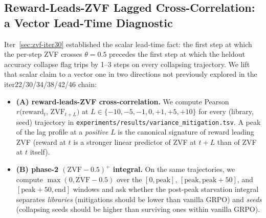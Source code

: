
\subsection{Reward-Leads-ZVF Lagged Cross-Correlation: a Vector Lead-Time Diagnostic}
\label{sec:zvf-lag}
Iter~\ref{sec:zvf-iter30} established the scalar lead-time fact: the
first step at which the per-step ZVF crosses $\theta{=}0.5$
precedes the first step at which the heldout accuracy collapse flag
trips by 1--3 steps on every collapsing trajectory. We lift that scalar
claim to a vector one in two directions not previously explored in the
iter22/30/34/38/42/46 chain:
\begin{itemize}
\item \textbf{(A) reward-leads-ZVF cross-correlation.} We compute
Pearson $r\bigl(\mathrm{reward}_t,\, \mathrm{ZVF}_{t+L}\bigr)$ at
$L \in \{-10,-5,-1,0,+1,+5,+10\}$ for every (library, seed)
trajectory in \texttt{experiments/results/variance_mitigation.tsv}. A
peak of the lag profile at a \emph{positive} $L$ is the canonical
signature of reward leading ZVF (reward at $t$ is a stronger linear
predictor of ZVF at $t+L$ than of ZVF at $t$ itself).
\item \textbf{(B) phase-2 $(\mathrm{ZVF}{-}0.5)^+$ integral.} On the same
trajectories, we compute
$\overline{\max(0,\mathrm{ZVF}{-}0.5)}$ over the $[0,\text{peak}]$,
$[\text{peak},\text{peak}{+}50]$, and $[\text{peak}{+}50,\text{end}]$
windows and ask whether the post-peak starvation integral separates
\textit{libraries} (mitigations should be lower than vanilla GRPO)
and \textit{seeds} (collapsing seeds should be higher than surviving
ones within vanilla GRPO).
\end{itemize}

